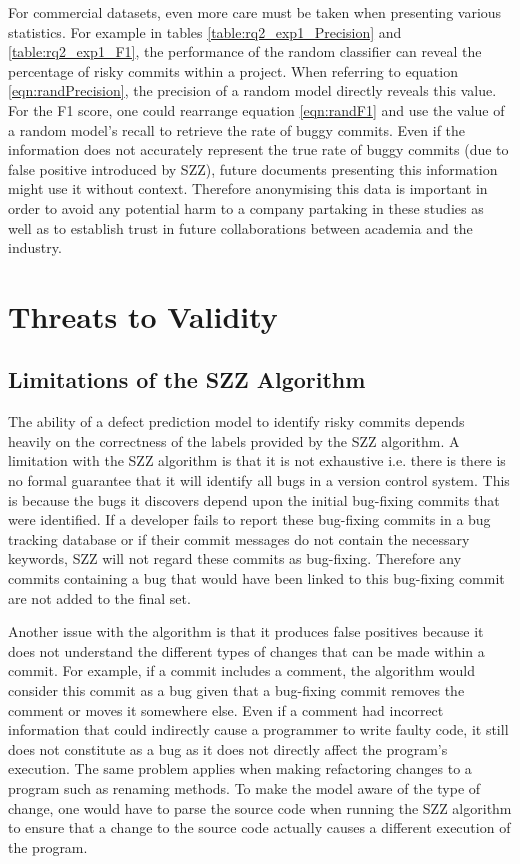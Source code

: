 \documentclass[../main.tex]{subfiles}
\begin{document}
For commercial datasets, even more care must be taken when presenting various statistics. For example in tables \ref{table:rq2_exp1_Precision} and \ref{table:rq2_exp1_F1}, the performance of the random classifier can reveal the percentage of risky commits within a project. When referring to equation \ref{eqn:randPrecision}, the precision of a random model directly reveals this value. For the F1 score, one could rearrange equation \ref{eqn:randF1} and use the value of a random model's recall to retrieve the rate of buggy commits. Even if the information does not accurately represent the true rate of buggy commits (due to false positive introduced by SZZ), future documents presenting this information might use it without context. Therefore anonymising this data is important in order to avoid any potential harm to a company partaking in these studies as well as to establish trust in future collaborations between academia and the industry.

\section{Threats to Validity}

\subsection{Limitations of the SZZ Algorithm}

The ability of a defect prediction model to identify risky commits depends heavily on the correctness of the labels provided by the SZZ algorithm. A limitation with the SZZ algorithm is that it is not exhaustive i.e. there is there is no formal guarantee that it will identify all bugs in a version control system. This is because the bugs it discovers depend upon the initial bug-fixing commits that were identified. If a developer fails to report these bug-fixing commits in a bug tracking database or if their commit messages do not contain the necessary keywords, SZZ will not regard these commits as bug-fixing. Therefore any commits containing a bug that would have been linked to this bug-fixing commit are not added to the final set. 

Another issue with the algorithm is that it produces false positives because it does not understand the different types of changes that can be made within a commit. For example, if a commit includes a comment, the algorithm would consider this commit as a bug given that a bug-fixing commit removes the comment or moves it somewhere else. Even if a comment had incorrect information that could indirectly cause a programmer to write faulty code, it still does not constitute as a bug as it does not directly affect the program's execution. The same problem applies when making refactoring changes to a program such as renaming methods. To make the model aware of the type of change, one would have to parse the source code when running the SZZ algorithm to ensure that a change to the source code actually causes a different execution of the program.
\end{document}
